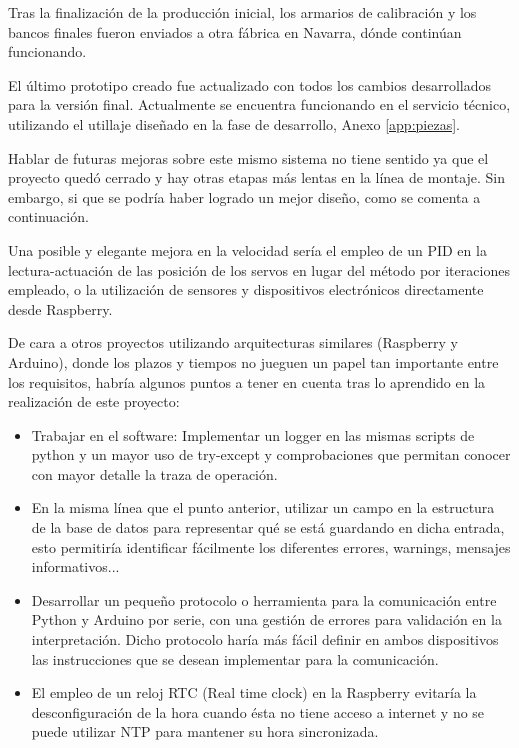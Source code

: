 Tras la finalización de la producción inicial, los armarios de calibración y los bancos finales fueron enviados a otra fábrica en Navarra, dónde continúan funcionando.

El último prototipo creado fue actualizado con todos los cambios desarrollados para la versión final. Actualmente se encuentra funcionando en el servicio técnico, utilizando el utillaje diseñado en la fase de desarrollo, Anexo \ref{app:piezas}.

Hablar de futuras mejoras sobre este mismo sistema no tiene sentido ya que el proyecto quedó cerrado y hay otras etapas más lentas en la línea de montaje. Sin embargo, si que se podría haber logrado un mejor diseño, como se comenta a continuación.

Una posible y elegante mejora en la velocidad sería el empleo de un PID en la lectura-actuación de las posición de los servos en lugar del método por iteraciones empleado, o la utilización de sensores y dispositivos electrónicos directamente desde Raspberry.

De cara a otros proyectos utilizando arquitecturas similares (Raspberry y Arduino), donde los plazos y tiempos no jueguen un papel tan importante entre los requisitos, habría algunos puntos a tener en cuenta tras lo aprendido en la realización de este proyecto:

\begin{itemize}
  \item Trabajar en el software: Implementar un logger en las mismas scripts de python y un mayor uso de try-except y comprobaciones que permitan conocer con mayor detalle la traza de operación.
  \item En la misma línea que el punto anterior, utilizar un campo en la estructura de la base de datos para representar qué se está guardando en dicha entrada, esto permitiría identificar fácilmente los diferentes errores, warnings, mensajes informativos...
  \item Desarrollar un pequeño protocolo o herramienta para la comunicación entre Python y Arduino por serie, con una gestión de errores para validación en la interpretación. Dicho protocolo haría más fácil definir en ambos dispositivos las instrucciones que se desean implementar para la comunicación.
  \item El empleo de un reloj RTC (Real time clock) en la Raspberry evitaría la desconfiguración de la hora cuando ésta no tiene acceso a internet y no se puede utilizar NTP para mantener su hora sincronizada.
\end{itemize}
